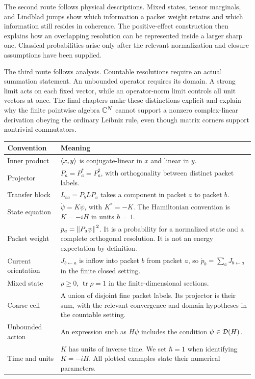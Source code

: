 The second route follows physical descriptions. Mixed states, tensor marginals, and Lindblad jumps show which information a packet weight retains and which information still resides in coherence. The positive-effect construction then explains how an overlapping resolution can be represented inside a larger sharp one. Classical probabilities arise only after the relevant normalization and closure assumptions have been supplied.

The third route follows analysis. Countable resolutions require an actual summation statement. An unbounded operator requires its domain. A strong limit acts on each fixed vector, while an operator-norm limit controls all unit vectors at once. The final chapters make these distinctions explicit and explain why the finite pointwise algebra $\mathbb C^N$ cannot support a nonzero complex-linear derivation obeying the ordinary Leibniz rule, even though matrix corners support nontrivial commutators.

\begin{longtable}{@{}L{.24\linewidth}L{.67\linewidth}@{}}
\toprule
Convention & Meaning\\\midrule\endhead
Inner product & $\left\langle x,y\right\rangle$ is conjugate-linear in $x$ and linear in $y$.\\
Projector & $P_a=P_a^*=P_a^2$, with orthogonality between distinct packet labels.\\
Transfer block & $L_{ba}=P_bLP_a$ takes a component in packet $a$ to packet $b$.\\
State equation & $\dot\psi=K\psi$, with $K^*=-K$. The Hamiltonian convention is $K=-iH$ in units $\hbar=1$.\\
Packet weight & $p_a=\left\lVert P_a\psi\right\rVert^2$. It is a probability for a normalized state and a complete orthogonal resolution. It is not an energy expectation by definition.\\
Current orientation & $J_{b\leftarrow a}$ is inflow into packet $b$ from packet $a$, so $\dot p_b=\sum_aJ_{b\leftarrow a}$ in the finite closed setting.\\
Mixed state & $\rho\geq0$, $\operatorname{tr}\rho=1$ in the finite-dimensional sections.\\
Coarse cell & A union of disjoint fine packet labels. Its projector is their sum, with the relevant convergence and domain hypotheses in the countable setting.\\
Unbounded action & An expression such as $H\psi$ includes the condition $\psi\in\mathcal D(H)$.\\
Time and units & $K$ has units of inverse time. We set $\hbar=1$ when identifying $K=-iH$. All plotted examples state their numerical parameters.\\
\bottomrule
\end{longtable}

